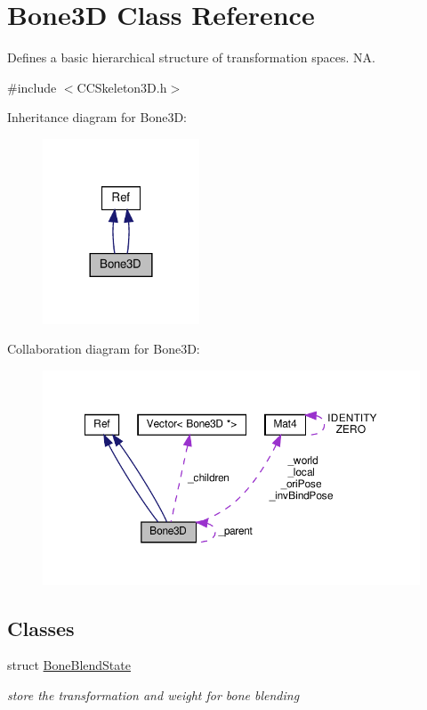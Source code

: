 \hypertarget{classBone3D}{}\section{Bone3D Class Reference}
\label{classBone3D}


Defines a basic hierarchical structure of transformation spaces.  NA.  




{\ttfamily \#include $<$C\+C\+Skeleton3\+D.\+h$>$}



Inheritance diagram for Bone3D\+:
\nopagebreak
\begin{figure}[H]
\begin{center}
\leavevmode
\includegraphics[width=132pt]{classBone3D__inherit__graph}
\end{center}
\end{figure}


Collaboration diagram for Bone3D\+:
\nopagebreak
\begin{figure}[H]
\begin{center}
\leavevmode
\includegraphics[width=350pt]{classBone3D__coll__graph}
\end{center}
\end{figure}
\subsection*{Classes}
\begin{DoxyCompactItemize}
\item 
struct \hyperlink{structBone3D_1_1BoneBlendState}{Bone\+Blend\+State}
\begin{DoxyCompactList}\small\item\em store the transformation and weight for bone blending \end{DoxyCompactList}\end{DoxyCompactItemize}
